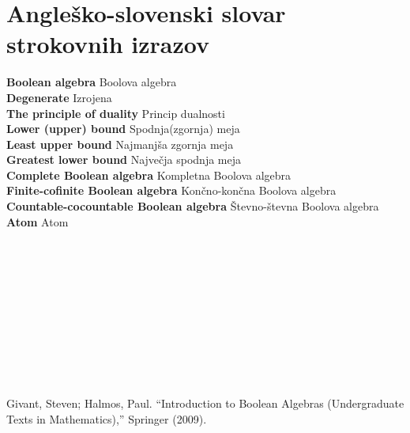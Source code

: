\documentclass{amsart}
\newcommand{\geslo}[2]{\noindent\textbf{#1} \quad \hangindent=1cm #2\\[-1pc]}
\begin{document}
\newpage
\section*{Angleško-slovenski slovar strokovnih izrazov}


\geslo{Boolean algebra}{Boolova algebra}

\geslo{Degenerate}{Izrojena}

\geslo{The principle of duality}{Princip dualnosti}

\geslo{Lower (upper) bound}{Spodnja(zgornja) meja}

\geslo{Least upper bound}{Najmanjša zgornja meja}

\geslo{Greatest lower bound}{Največja spodnja meja}

\geslo{Complete Boolean algebra}{Kompletna Boolova algebra}

\geslo{Finite-cofinite Boolean algebra}{Končno-končna Boolova algebra}

\geslo{Countable-cocountable Boolean algebra}{Števno-števna Boolova algebra}

\geslo{Atom}{Atom}

\geslo{}{}

\geslo{}{}

\geslo{}{}

\geslo{}{}

\geslo{}{}

\geslo{}{}

\geslo{}{}

\geslo{}{}

\geslo{}{}


\geslo{}{}






\begin{thebibliography}{1}
Givant, Steven; Halmos, Paul. “Introduction to Boolean Algebras (Undergraduate Texts in Mathematics),” Springer (2009).
\end{thebibliography}
\end{document}
